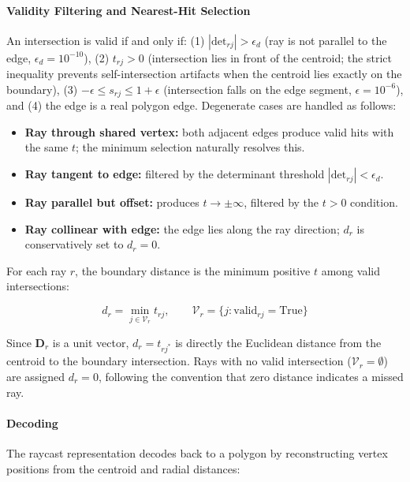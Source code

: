 \paragraph{Validity Filtering and Nearest-Hit Selection}
An intersection is valid if and only if: (1) $|\text{det}_{rj}| > \epsilon_d$ (ray is not parallel to the edge, $\epsilon_d = 10^{-10}$), (2) $t_{rj} > 0$ (intersection lies in front of the centroid; the strict inequality prevents self-intersection artifacts when the centroid lies exactly on the boundary), (3) $-\epsilon \leq s_{rj} \leq 1 + \epsilon$ (intersection falls on the edge segment, $\epsilon = 10^{-6}$), and (4) the edge is a real polygon edge. Degenerate cases are handled as follows:

\begin{itemize}
    \item \textbf{Ray through shared vertex:} both adjacent edges produce valid hits with the same $t$; the minimum selection naturally resolves this.
    \item \textbf{Ray tangent to edge:} filtered by the determinant threshold $|\text{det}_{rj}| < \epsilon_d$.
    \item \textbf{Ray parallel but offset:} produces $t \to \pm\infty$, filtered by the $t > 0$ condition.
    \item \textbf{Ray collinear with edge:} the edge lies along the ray direction; $d_r$ is conservatively set to $d_r = 0$.
\end{itemize}

For each ray $r$, the boundary distance is the minimum positive $t$ among valid intersections:

\begin{equation}
    d_r = \min_{j \in \mathcal{V}_r} t_{rj}, \qquad \mathcal{V}_r = \{j : \text{valid}_{rj} = \text{True}\}
\end{equation}

Since $\mathbf{D}_r$ is a unit vector, $d_r = t_{rj^*}$ is directly the Euclidean distance from the centroid to the boundary intersection. Rays with no valid intersection ($\mathcal{V}_r = \emptyset$) are assigned $d_r = 0$, following the convention that zero distance indicates a missed ray.

\paragraph{Decoding}
The raycast representation decodes back to a polygon by reconstructing vertex positions from the centroid and radial distances:

